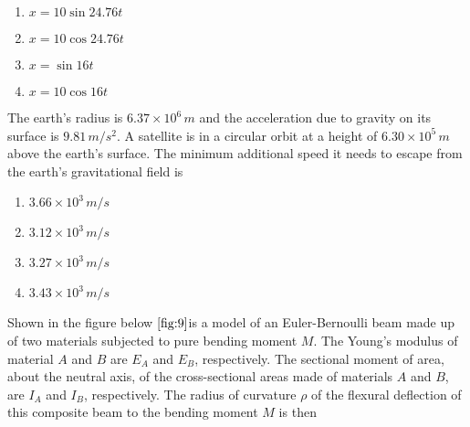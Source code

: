 \begin{multicols}{2}
    \begin{enumerate}
        \item $ x = 10 \sin 24.76t $
        \item $ x = 10 \cos 24.76t $
        \item $ x = \sin 16t $
        \item $ x = 10 \cos 16t $
    \end{enumerate}
\end{multicols}
\bigskip
\item The earth's radius is $6.37 \times 10^6 \, m$ and the acceleration due to gravity on its surface is $9.81 \, m/s^2$. A satellite is in a circular orbit at a height of $6.30 \times 10^5 \, m$ above the earth's surface. The minimum additional speed it needs to escape from the earth's gravitational field is
\begin{multicols}{2}
    \begin{enumerate}
        \item $ 3.66 \times 10^3 \, m/s $
        \item $ 3.12 \times 10^3 \, m/s $
        \item $ 3.27 \times 10^3 \, m/s $
        \item $ 3.43 \times 10^3 \, m/s $
    \end{enumerate}
\end{multicols}
\bigskip
\item Shown in the figure below $\ref{fig:9}$is a model of an Euler-Bernoulli beam made up of two materials subjected to pure bending moment $M$. The Young's modulus of material $A$ and $B$ are $E_A$ and $E_B$, respectively. The sectional moment of area, about the neutral axis, of the cross-sectional areas made of materials $A$ and $B$, are $I_A$ and $I_B$, respectively. The radius of curvature $\rho$ of the flexural deflection of this composite beam to the bending moment $M$ is then\\\\
\usetikzlibrary{patterns}
